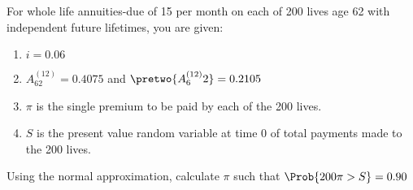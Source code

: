 For whole life annuities-due of 15 per month on each of 200 lives age 62 with independent
future lifetimes, you are given:
\begin{enumerate}
\item $i=0.06$
\item $A_{62}^{(12)} = 0.4075$ and $\pretwo{A^{(12)}_62} = 0.2105$
\item $\pi$ is the single premium to be paid by each of the 200 lives.
\item $S$ is the present value random variable at time 0 of total payments made to the 200 lives.
\end{enumerate}
Using the normal approximation, calculate $\pi$ such that $\Prob{200\pi>S}=0.90$
\showsol{\bsoln

\esoln}
